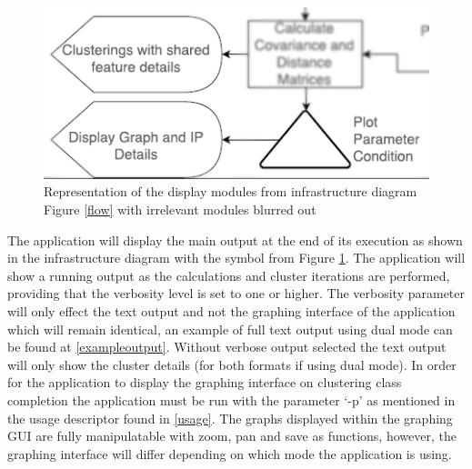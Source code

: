 \begin{figure}[!h]
\centering
\includegraphics{./Figures/display.png}
\caption{Representation of the display modules from infrastructure diagram Figure \ref{flow} with irrelevant modules blurred out}
\label{display}
\end{figure}

The application will display the main output at the end of its execution as shown in the infrastructure diagram with the symbol from Figure \ref{display}. The application will show a running output as the calculations and cluster iterations are performed, providing that the verbosity level is set to one or higher. The verbosity parameter will only effect the text output and not the graphing interface of the application which will remain identical, an example of full text output using dual mode can be found at \ref{exampleoutput}. Without verbose output selected the text output will only show the cluster details (for both formats if using dual mode). In order for the application to display the graphing interface on clustering class completion the application must be run with the parameter ‘-p’ as mentioned in the usage descriptor found in \ref{usage}. The graphs displayed within the graphing GUI are fully manipulatable with zoom, pan and save as functions, however, the graphing interface will differ depending on which mode the application is using. \linebreak
